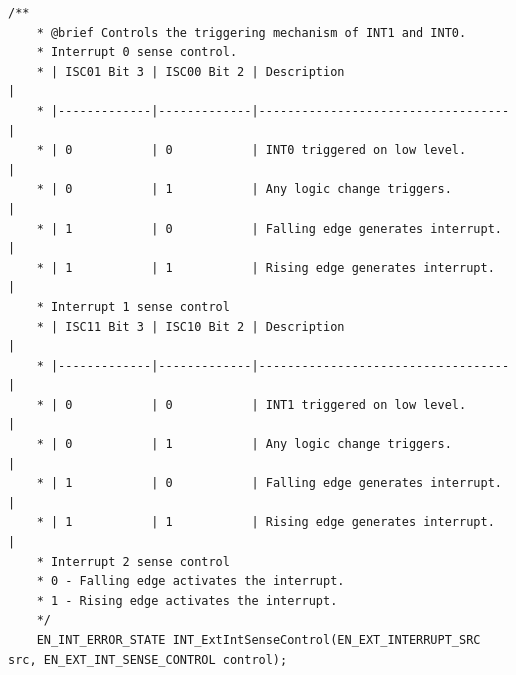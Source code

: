 \documentclass[10pt]{article}
\begin{document}
\begin{lstlisting}[style=CStyle,escapeinside=``]
	/**
	* @brief Controls the triggering mechanism of INT1 and INT0.
	* Interrupt 0 sense control.
	* | ISC01 Bit 3 | ISC00 Bit 2 | Description                       |
	* |-------------|-------------|-----------------------------------|
	* | 0           | 0           | INT0 triggered on low level.      |
	* | 0           | 1           | Any logic change triggers.        |
	* | 1           | 0           | Falling edge generates interrupt. |
	* | 1           | 1           | Rising edge generates interrupt.  |
	* Interrupt 1 sense control
	* | ISC11 Bit 3 | ISC10 Bit 2 | Description                       |
	* |-------------|-------------|-----------------------------------|
	* | 0           | 0           | INT1 triggered on low level.      |
	* | 0           | 1           | Any logic change triggers.        |
	* | 1           | 0           | Falling edge generates interrupt. |
	* | 1           | 1           | Rising edge generates interrupt.  |
	* Interrupt 2 sense control
	* 0 - Falling edge activates the interrupt.
	* 1 - Rising edge activates the interrupt.
	*/
	EN_INT_ERROR_STATE INT_ExtIntSenseControl(EN_EXT_INTERRUPT_SRC src, EN_EXT_INT_SENSE_CONTROL control);
\end{lstlisting}
\end{document}
